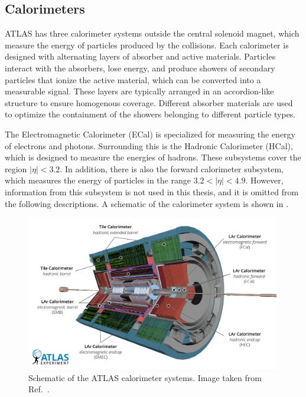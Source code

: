 \subsection{Calorimeters}

ATLAS has three calorimeter systems outside the central solenoid magnet, which measure the energy of particles produced by the collisions.
Each calorimeter is designed with alternating layers of absorber and active materials.
Particles interact with the absorbers, lose energy, and produce showers of secondary particles that ionize the active material, which can be converted into a measurable signal.
These layers are typically arranged in an accordion-like structure to ensure homogenous coverage.
Different absorber materials are used to optimize the containment of the showers belonging to different particle types.

The Electromagnetic Calorimeter (ECal) is specialized for measuring the energy of electrons and photons.
Surrounding this is the Hadronic Calorimeter (HCal), which is designed to measure the energies of hadrons.
These subsystems cover the region $|\eta| < 3.2$.
In addition, there is also the forward calorimeter subsystem, which measures the energy of particles in the range $3.2 < |\eta| < 4.9$.
However, information from this subsystem is not used in this thesis, and it is omitted from the following descriptions.
A schematic of the calorimeter system is shown in .

\begin{figure}[htb]
    \centering
    \includegraphics[width=0.99\textwidth]{Figures/cern_atlas/Calos.png}
    \caption{Schematic of the ATLAS calorimeter systems. Image taken from Ref.~\cite{ATLASRun3}.}
    \label{fig:atlas_calorimeters}
\end{figure}

